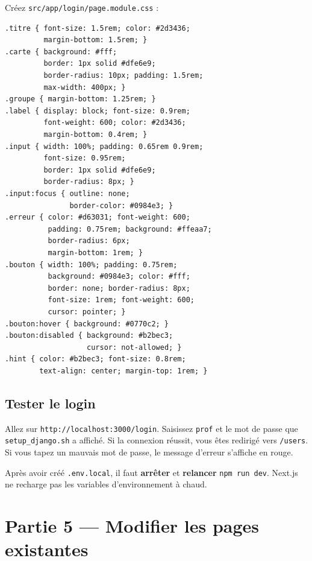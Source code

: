 \documentclass[11pt,a4paper]{article}
\begin{document}
Créez \texttt{src/app/login/page.module.css} :

\begin{lstlisting}[style=terminal]
.titre { font-size: 1.5rem; color: #2d3436;
         margin-bottom: 1.5rem; }
.carte { background: #fff;
         border: 1px solid #dfe6e9;
         border-radius: 10px; padding: 1.5rem;
         max-width: 400px; }
.groupe { margin-bottom: 1.25rem; }
.label { display: block; font-size: 0.9rem;
         font-weight: 600; color: #2d3436;
         margin-bottom: 0.4rem; }
.input { width: 100%; padding: 0.65rem 0.9rem;
         font-size: 0.95rem;
         border: 1px solid #dfe6e9;
         border-radius: 8px; }
.input:focus { outline: none;
               border-color: #0984e3; }
.erreur { color: #d63031; font-weight: 600;
          padding: 0.75rem; background: #ffeaa7;
          border-radius: 6px;
          margin-bottom: 1rem; }
.bouton { width: 100%; padding: 0.75rem;
          background: #0984e3; color: #fff;
          border: none; border-radius: 8px;
          font-size: 1rem; font-weight: 600;
          cursor: pointer; }
.bouton:hover { background: #0770c2; }
.bouton:disabled { background: #b2bec3;
                   cursor: not-allowed; }
.hint { color: #b2bec3; font-size: 0.8rem;
        text-align: center; margin-top: 1rem; }
\end{lstlisting}

\subsection{Tester le login}

Allez sur \texttt{http://localhost:3000/login}. Saisissez \texttt{prof} et le mot de passe que \texttt{setup\_django.sh} a affiché. Si la connexion réussit, vous êtes redirigé vers \texttt{/users}. Si vous tapez un mauvais mot de passe, le message d'erreur s'affiche en rouge.

\begin{attentionbox}
Après avoir créé \texttt{.env.local}, il faut \textbf{arrêter} et \textbf{relancer} \texttt{npm run dev}. Next.js ne recharge pas les variables d'environnement à chaud.
\end{attentionbox}

\section{Partie 5 --- Modifier les pages existantes}
\end{document}

